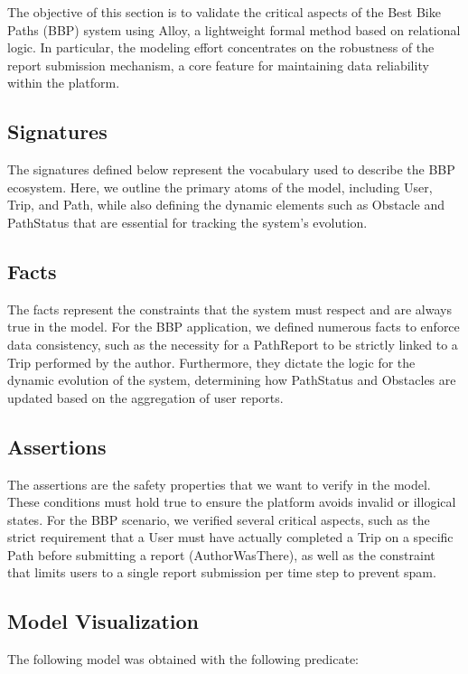 \noindent
The objective of this section is to validate the critical aspects of the Best Bike Paths (BBP) system using Alloy, a lightweight formal method based on relational logic. In particular, the modeling effort concentrates on the robustness of the report submission mechanism, a core feature for maintaining data reliability within the platform.
\subsection{Signatures}
The signatures defined below represent the vocabulary used to describe the BBP ecosystem. Here, we outline the primary atoms of the model, including User, Trip, and Path, while also defining the dynamic elements such as Obstacle and PathStatus that are essential for tracking the system's evolution.




\newpage
\subsection{Facts}
The facts represent the constraints that the system must respect and are always true in the model. For the BBP application, we defined numerous facts to enforce data consistency, such as the necessity for a PathReport to be strictly linked to a Trip performed by the author. Furthermore, they dictate the logic for the dynamic evolution of the system, determining how PathStatus and Obstacles are updated based on the aggregation of user reports.


\subsection{Assertions}
The assertions are the safety properties that we want to verify in the model. These conditions must hold true to ensure the platform avoids invalid or illogical states. For the BBP scenario, we verified several critical aspects, such as the strict requirement that a User must have actually completed a Trip on a specific Path before submitting a report (AuthorWasThere), as well as the constraint that limits users to a single report submission per time step to prevent spam.


\subsection{Model Visualization}
The following model was obtained with the following predicate:


